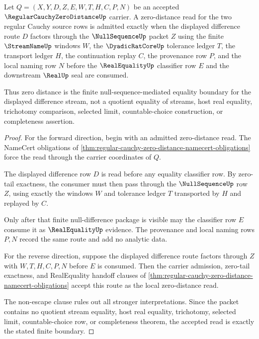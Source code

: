 \begin{theorem}
\label{thm:regular-cauchy-zero-distance-nullsequence-criterion}
Let $Q=(X,Y,D,Z,E,W,T,H,C,P,N)$ be an accepted $\RegularCauchyZeroDistanceUp$ carrier. A zero-distance read for the two regular Cauchy source rows is admitted exactly when the displayed difference route $D$ factors through the $\NullSequenceUp$ packet $Z$ using the finite $\StreamNameUp$ windows $W$, the $\DyadicRatCoreUp$ tolerance ledger $T$, the transport ledger $H$, the continuation replay $C$, the provenance row $P$, and the local naming row $N$ before the $\RealEqualityUp$ classifier row $E$ and the downstream $\RealUp$ seal are consumed.

Thus zero distance is the finite null-sequence-mediated equality boundary for the displayed difference stream, not a quotient equality of streams, host real equality, trichotomy comparison, selected limit, countable-choice construction, or completeness assertion.
\end{theorem}
\begin{proof}
For the forward direction, begin with an admitted zero-distance read. The NameCert obligations of \autoref{thm:regular-cauchy-zero-distance-namecert-obligations} force the read through the carrier coordinates of $Q$.

The displayed difference row $D$ is read before any equality classifier row. By zero-tail exactness, the consumer must then pass through the $\NullSequenceUp$ row $Z$, using exactly the windows $W$ and tolerance ledger $T$ transported by $H$ and replayed by $C$.

Only after that finite null-difference package is visible may the classifier row $E$ consume it as $\RealEqualityUp$ evidence. The provenance and local naming rows $P,N$ record the same route and add no analytic data.

For the reverse direction, suppose the displayed difference route factors through $Z$ with $W,T,H,C,P,N$ before $E$ is consumed. Then the carrier admission, zero-tail exactness, and RealEquality handoff clauses of \autoref{thm:regular-cauchy-zero-distance-namecert-obligations} accept this route as the local zero-distance read.

The non-escape clause rules out all stronger interpretations. Since the packet contains no quotient stream equality, host real equality, trichotomy, selected limit, countable-choice row, or completeness theorem, the accepted read is exactly the stated finite boundary.
\end{proof}


